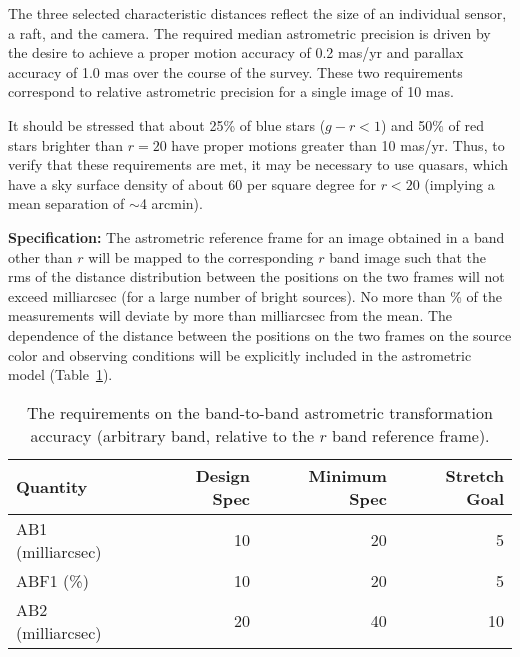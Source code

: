 The three selected characteristic distances reflect the size of an
individual sensor, a
raft, and the camera. The required median astrometric precision is driven by
the desire to achieve a proper motion accuracy of 0.2 mas/yr and parallax
accuracy of 1.0 mas over the course of the survey. These two requirements
correspond to relative astrometric precision for a single image of 10 mas.

It should be stressed that about 25\% of blue stars ($g-r<1$) and 50\% of
red stars brighter than $r=20$ have proper motions greater than 10
mas/yr. Thus, to verify that these requirements are met, it may be
necessary to use quasars, which have a sky surface density of about 60 per
square degree for $r<20$ (implying a mean separation of $\sim$4 arcmin).

{\bf Specification:} The astrometric reference frame for an image obtained
in a band other than $r$ will be mapped to the corresponding $r$ band image
such that the rms of the distance distribution between the positions on the
two frames will not exceed
milliarcsec (for a large number of bright sources). No more than
\% of the measurements will deviate by more than
milliarcsec from the mean. The dependence of the distance between the
positions on the two frames on the source color and observing
conditions will be explicitly included in the astrometric model
(Table~\ref{Tastrob2b}).

\begin{table}[h]
\begin{tabular}{|l|r|r|r|}
\hline
Quantity   & Design Spec & Minimum Spec & Stretch Goal     \\
\hline
    AB1 (milliarcsec)  &    10      &        20    &        5         \\
    ABF1 (\%)          &    10      &        20    &        5         \\
    AB2 (milliarcsec)  &    20      &        40   &        10         \\
\hline

\end{tabular}
\caption{The requirements on the band-to-band astrometric transformation
accuracy (arbitrary band, relative to the $r$ band reference frame).}
\label{Tastrob2b}
\end{table}

